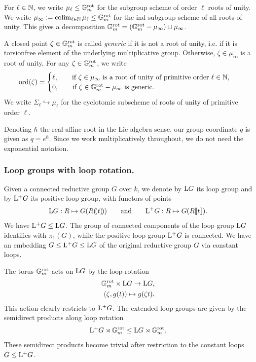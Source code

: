 For $\ell \in \operatorname{\mathbb{N}}$, we write $\mu_{\ell} \leq \mathbb{G}_m^{\mathrm{rot}}$ for the subgroup scheme of order $\ell$ roots of unity. We write $\mu_{\infty} := \operatorname*{colim}_{\ell \in \operatorname{\mathbb{N}}} \mu_{\ell} \leq \mathbb{G}_m^{\mathrm{rot}}$ for the ind-subgroup scheme of all roots of unity. This gives a decomposition $\mathbb{G}_m^{\mathrm{rot}} = (\mathbb{G}_m^{\mathrm{rot}} - \mu_{\infty}) \sqcup \mu_{\infty}$.


A closed point $\zeta \in \mathbb{G}_m^{\mathrm{rot}}$ is called {\it generic} if it is not a root of unity, i.e. if it is torsionfree element of the underlying multiplicative group. Otherwise, $\zeta \in \mu_{\infty}$ is a root of unity.
For any $\zeta \in \mathbb{G}_m^{\mathrm{rot}}$, we write
\begin{equation*}
\mathrm{ord}(\zeta) =
\begin{cases}
\ell, \qquad \text{if} \ \zeta \in \mu_{\infty} \ \text{is a root of unity of primitive order} \ \ell \in \operatorname{\mathbb{N}}, \\
0, \qquad \text{if} \ \zeta \in \mathbb{G}_m^{\mathrm{rot}} - \mu_{\infty} \ \text{is generic}.
\end{cases}
\end{equation*}
We write $\Sigma_{\ell} \hookrightarrow \mu_{\ell}$ for the cyclotomic subscheme of roots of unity of primitive order $\ell$. 

Denoting $\hbar$ the real affine root in the Lie algebra sense, our group coordinate $q$ is given as $q = e^{\hbar}$. Since we work multiplicatively throughout, we do not need the exponential notation.


\subsubsection{Loop groups with loop rotation.}
Given a connected reductive group $G$ over $k$, we denote by $\mathrm{L} G$ its loop group and by $\mathrm{L^+} G$ its positive loop group, with functors of points
\begin{equation*}
    \mathrm{L} G: R \mapsto G(R(\!( t )\!)) \qquad \text{and} \qquad \mathrm{L^+} G: R \mapsto G(R\llbracket t \rrbracket).
\end{equation*}
We have $\mathrm{L^+} G \leq \mathrm{L} G$. The group of connected components of the loop group $\mathrm{L} G$ identifies with $\pi_1(G)$, while the positive loop group $\mathrm{L^+} G$ is connected. We have an embedding $G \leq \mathrm{L^+} G \leq \mathrm{L} G$ of the original reductive group $G$ via constant loops.


The torus $\mathbb{G}_m^{\mathrm{rot}}$ acts on $\mathrm{L} G$ by the loop rotation 
\begin{align*}
\mathbb{G}_m^{\mathrm{rot}} \times \mathrm{L} G \to \mathrm{L} G  , \\
(\zeta, g(t)) \mapsto g(\zeta t).
\end{align*}
This action clearly restricts to $\mathrm{L^+} G$. 
%
The extended loop groups are given by the semidirect products along loop rotation
\begin{equation*}
\mathrm{L^+} G \rtimes \mathbb{G}_m^{\mathrm{rot}} \leq \mathrm{L} G \rtimes \mathbb{G}_m^{\mathrm{rot}}.   
\end{equation*}
These semidirect products become trivial after restriction to the constant loops $G \leq \mathrm{L^+} G$.

